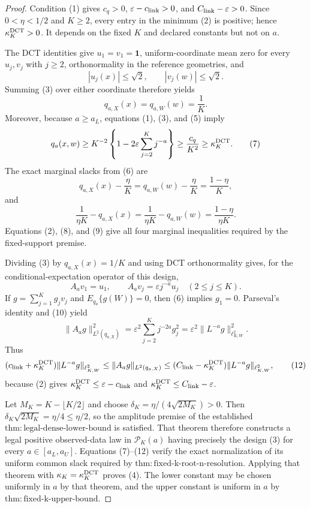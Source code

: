 \documentclass{article}
\begin{document}
\begin{proof}
Condition (1) gives \(c_q>0\), \(\varepsilon-c_{\rm link}>0\), and \(C_{\rm link}-\varepsilon>0\). Since \(0<\eta<1/2\) and \(K\ge2\), every entry in the minimum (2) is positive; hence \(\kappa_K^{\rm DCT}>0\). It depends on the fixed \(K\) and declared constants but not on \(a\).

The DCT identities give \(u_1=v_1=\mathbf1\), uniform-coordinate mean zero for every \(u_j,v_j\) with \(j\ge2\), orthonormality in the reference geometries, and
\[
|u_j(x)|\le\sqrt2,
\qquad
|v_j(w)|\le\sqrt2.
\tag{5}
\]
Summing (3) over either coordinate therefore yields
\[
q_{a,X}(x)=q_{a,W}(w)=\frac1K.
\tag{6}
\]
Moreover, because \(a\ge a_L\), equations (1), (3), and (5) imply
\[
q_a(x,w)
\ge K^{-2}\left\{1-2\varepsilon\sum_{j=2}^Kj^{-a}\right\}
\ge\frac{c_q}{K^2}
\ge\kappa_K^{\rm DCT}.
\tag{7}
\]
The exact marginal slacks from (6) are
\[
q_{a,X}(x)-\frac\eta K
=q_{a,W}(w)-\frac\eta K
=\frac{1-\eta}{K},
\tag{8}
\]
and
\[
\frac1{\eta K}-q_{a,X}(x)
=\frac1{\eta K}-q_{a,W}(w)
=\frac{1-\eta}{\eta K}.
\tag{9}
\]
Equations (2), (8), and (9) give all four marginal inequalities required by the fixed-support premise.

Dividing (3) by \(q_{a,X}(x)=1/K\) and using DCT orthonormality gives, for the conditional-expectation operator of this design,
\[
A_av_1=u_1,
\qquad
A_av_j=\varepsilon j^{-a}u_j
\quad(2\le j\le K).
\tag{10}
\]
If \(g=\sum_{j=1}^Kg_jv_j\) and \(E_{q_a}\{g(W)\}=0\), then (6) implies \(g_1=0\). Parseval's identity and (10) yield
\[
\|A_ag\|_{L^2(q_{a,X})}^2
=\varepsilon^2\sum_{j=2}^Kj^{-2a}g_j^2
=\varepsilon^2\|L^{-a}g\|_{\ell^2_{K,W}}^2.
\tag{11}
\]
Thus
\[
(c_{\rm link}+\kappa_K^{\rm DCT})\|L^{-a}g\|_{\ell^2_{K,W}}
\le\|A_ag\|_{L^2(q_{a,X})}
\le(C_{\rm link}-\kappa_K^{\rm DCT})\|L^{-a}g\|_{\ell^2_{K,W}},
\tag{12}
\]
because (2) gives \(\kappa_K^{\rm DCT}\le\varepsilon-c_{\rm link}\) and \(\kappa_K^{\rm DCT}\le C_{\rm link}-\varepsilon\).

Let \(M_K=K-\lfloor K/2\rfloor\) and choose \(\delta_K=\eta/(4\sqrt{2M_K})>0\). Then \(\delta_K\sqrt{2M_K}=\eta/4\le\eta/2\), so the amplitude premise of the established \(\mathrm{thm:legal\mbox{-}dense\mbox{-}lower\mbox{-}bound}\) is satisfied. That theorem therefore constructs a legal positive observed-data law in \(\mathcal P_K(a)\) having precisely the design (3) for every \(a\in[a_L,a_U]\). Equations (7)--(12) verify the exact normalization of its uniform common slack required by \(\mathrm{thm:fixed\mbox{-}k\mbox{-}root\mbox{-}n\mbox{-}resolution}\). Applying that theorem with \(\kappa_K=\kappa_K^{\rm DCT}\) proves (4). The lower constant may be chosen uniformly in \(a\) by that theorem, and the upper constant is uniform in \(a\) by \(\mathrm{thm:fixed\mbox{-}k\mbox{-}upper\mbox{-}bound}\).
\end{proof}
\end{document}
